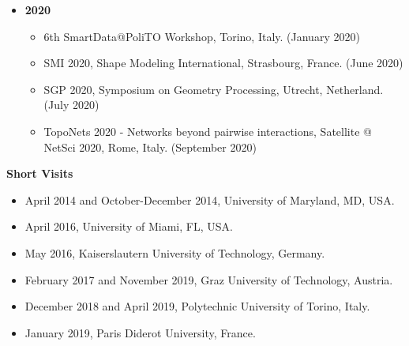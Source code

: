 \documentclass[11pt]{article}
\begin{document}
\begin{itemize}
\begin{itemize}
\item{SoCG 2019, 35th International Symposium on Computational Geometry, Portland, OR, USA. (June 2019)}
\item{{\"O}MG Conference 2019, Dornbirn, Austria. (September 2019)}
\item{5th SmartData@PoliTO Workshop, Barolo, Italy. (September 2019)}
\item{Complex Simplex: Topological and Network Data Science Workshop, Torino, Italy. (October 2019)}
\end{itemize}
\vspace*{0.2ex}
\item[ ]{\bf 2020}
\begin{itemize}
\item{6th SmartData@PoliTO Workshop, Torino, Italy. (January 2020)}
\item{SMI 2020, Shape Modeling International, Strasbourg, France. (June 2020)}
\item{SGP 2020, Symposium on Geometry Processing, Utrecht, Netherland. (July 2020)}
\item{TopoNets 2020 - Networks beyond pairwise interactions, Satellite @ NetSci 2020, Rome, Italy. (September 2020)}

\end{itemize}
\end{itemize}

\vspace*{2.5ex}
\noindent
{\Large\bf Short Visits}
\begin{itemize}
\item April 2014 and October-December 2014, University of Maryland, MD, USA.
\item April 2016, University of Miami, FL, USA.
\item May 2016, Kaiserslautern University of Technology, Germany.
\item February 2017 and November 2019, Graz University of Technology, Austria.
\item December 2018 and April 2019, Polytechnic University of Torino, Italy.
\item January 2019, Paris Diderot University, France.
\end{itemize}
\end{document}

